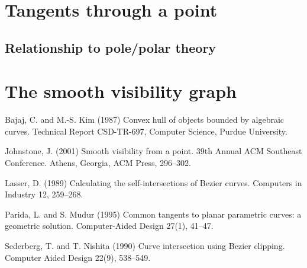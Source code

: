 \documentclass[12pt]{article}
\newif\ifJournal
\begin{document}

\section{Tangents through a point}


\subsection{Relationship to pole/polar theory}


\section{The smooth visibility graph}



\begin{thebibliography}{99}	%

Bajaj, C. and M.-S. Kim (1987)
Convex hull of objects bounded by algebraic curves.
Technical Report CSD-TR-697, Computer Science, Purdue University.

Johnstone, J. (2001)
Smooth visibility from a point.
39th Annual ACM Southeast Conference.
Athens, Georgia, ACM Press, 296--302.

\ifJournal
\bibitem{kim89}
Kim, M.-S. (1989)
Motion Planning with Geometric Models.
Ph.D. thesis, Computer Science, Purdue University.
\fi

Lasser, D. (1989)
Calculating the self-intersections of Bezier curves.
Computers in Industry 12, 259--268.

Parida, L. and S. Mudur (1995)
Common tangents to planar parametric curves: a geometric solution.
Computer-Aided Design 27(1), 41--47.

\ifJournal
\bibitem{rockwood90}
Rockwood, A. (1990)
Accurate display of tensor product isosurfaces.
Visualization '90, 353--360.
\fi

Sederberg, T. and T. Nishita (1990)
Curve intersection using Bezier clipping.
Computer Aided Design 22(9), 538--549.

\end{thebibliography}
\end{document}

